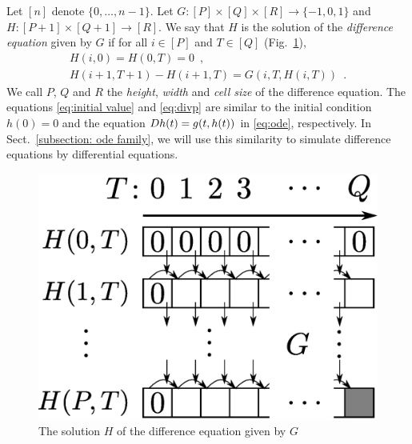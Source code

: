 Let $[n]$ denote $\{0, \dots , n-1\}$.
Let $G \colon [P] \times [Q] \times [R] \to \{-1, 0, 1\}$ and
$H \colon [P + 1] \times [Q+1] \to [R]$. 
We say that $H$ is the solution of the \emph{difference equation} given by $G$
if for all $i \in [P]$ and $T \in [Q]$ (Fig.~\ref{fig:divp}), 
\begin{gather}
   H(i, 0) = H(0, T) = 0 \enspace , \label{eq:initial value}
\\
   H(i + 1, T + 1) - H(i+1, T) = G(i, T, H(i, T)) \enspace .  \label{eq:divp}
\end{gather}
We call $P$, $Q$ and $R$ the \emph{height}, \emph{width} and \emph{cell size} of
the difference equation.
The equations \eqref{eq:initial value} and \eqref{eq:divp} are similar to 
the initial condition $h(0) = 0$ and the equation $D h(t) = g(t, h(t))$ 
in \eqref{eq:ode}, respectively.
In Sect.~\ref{subsection: ode family}, 
we will use this similarity to simulate difference equations by differential equations.

\begin{figure}
 \begin{center}
  \includegraphics[height=0.15\textheight]{image/divp.eps}
 \end{center}
 \caption{The solution $H$ of the difference equation given by $G$}
 \label{fig:divp}
\end{figure}

